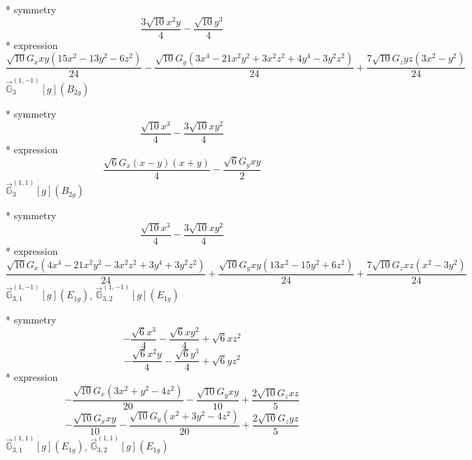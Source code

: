 \documentclass[fleqn,8pt]{jsarticle}
\begin{document}
\noindent\quad ** symmetry
\begin{dmath*}
\frac{3 \sqrt{10} x^{2} y}{4} - \frac{\sqrt{10} y^{3}}{4}
\end{dmath*}
\noindent\quad ** expression
\begin{dmath*}
\frac{\sqrt{10} G_{x} x y \left(15 x^{2} - 13 y^{2} - 6 z^{2}\right)}{24} - \frac{\sqrt{10} G_{y} \left(3 x^{4} - 21 x^{2} y^{2} + 3 x^{2} z^{2} + 4 y^{4} - 3 y^{2} z^{2}\right)}{24} + \frac{7 \sqrt{10} G_{z} y z \left(3 x^{2} - y^{2}\right)}{24}
\end{dmath*}
\noindent\quad $\vec{\mathbb{G}}_{3}^{(1,-1)}[g](B_{2g})$

\noindent\quad ** symmetry
\begin{dmath*}
\frac{\sqrt{10} x^{3}}{4} - \frac{3 \sqrt{10} x y^{2}}{4}
\end{dmath*}
\noindent\quad ** expression
\begin{dmath*}
\frac{\sqrt{6} G_{x} \left(x - y\right) \left(x + y\right)}{4} - \frac{\sqrt{6} G_{y} x y}{2}
\end{dmath*}
\noindent\quad $\vec{\mathbb{G}}_{3}^{(1,1)}[g](B_{2g})$

\noindent\quad ** symmetry
\begin{dmath*}
\frac{\sqrt{10} x^{3}}{4} - \frac{3 \sqrt{10} x y^{2}}{4}
\end{dmath*}
\noindent\quad ** expression
\begin{dmath*}
\frac{\sqrt{10} G_{x} \left(4 x^{4} - 21 x^{2} y^{2} - 3 x^{2} z^{2} + 3 y^{4} + 3 y^{2} z^{2}\right)}{24} + \frac{\sqrt{10} G_{y} x y \left(13 x^{2} - 15 y^{2} + 6 z^{2}\right)}{24} + \frac{7 \sqrt{10} G_{z} x z \left(x^{2} - 3 y^{2}\right)}{24}
\end{dmath*}
\noindent\quad $\vec{\mathbb{G}}_{3,1}^{(1,-1)}[g](E_{1g})$, $\vec{\mathbb{G}}_{3,2}^{(1,-1)}[g](E_{1g})$

\noindent\quad ** symmetry
\begin{dmath*}
- \frac{\sqrt{6} x^{3}}{4} - \frac{\sqrt{6} x y^{2}}{4} + \sqrt{6} x z^{2}
\end{dmath*}
\begin{dmath*}
- \frac{\sqrt{6} x^{2} y}{4} - \frac{\sqrt{6} y^{3}}{4} + \sqrt{6} y z^{2}
\end{dmath*}
\noindent\quad ** expression
\begin{dmath*}
- \frac{\sqrt{10} G_{x} \left(3 x^{2} + y^{2} - 4 z^{2}\right)}{20} - \frac{\sqrt{10} G_{y} x y}{10} + \frac{2 \sqrt{10} G_{z} x z}{5}
\end{dmath*}
\begin{dmath*}
- \frac{\sqrt{10} G_{x} x y}{10} - \frac{\sqrt{10} G_{y} \left(x^{2} + 3 y^{2} - 4 z^{2}\right)}{20} + \frac{2 \sqrt{10} G_{z} y z}{5}
\end{dmath*}
\noindent\quad $\vec{\mathbb{G}}_{3,1}^{(1,1)}[g](E_{1g})$, $\vec{\mathbb{G}}_{3,2}^{(1,1)}[g](E_{1g})$
\end{document}
